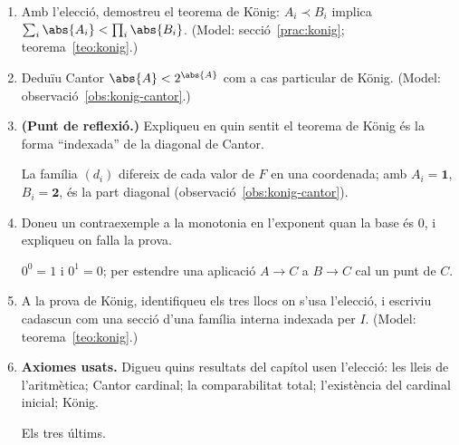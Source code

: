 \begin{enumerate}[resume]
  \item Amb l'elecció, demostreu el teorema de König: \(A_i\prec B_i\) implica \(\sum_i\abs{A_i}<\prod_i\abs{B_i}\). (Model: secció~\ref{prac:konig}; teorema~\ref{teo:konig}.)

  \item Deduïu Cantor \(\abs{A}<2^{\abs{A}}\) com a cas particular de König. (Model: observació~\ref{obs:konig-cantor}.)

  \item \textbf{(Punt de reflexió.)} Expliqueu en quin sentit el teorema de König és la forma \enquote{indexada} de la diagonal de Cantor. \begin{indicacio}La família \((d_i)\) difereix de cada valor de \(F\) en una coordenada; amb \(A_i=\mathbf1\), \(B_i=\mathbf2\), és la part diagonal (observació~\ref{obs:konig-cantor}).\end{indicacio}

  \item Doneu un contraexemple a la monotonia en l'exponent quan la base és \(0\), i expliqueu on falla la prova. \begin{indicacio}\(0^0=1\) i \(0^1=0\); per estendre una aplicació \(A\to C\) a \(B\to C\) cal un punt de \(C\).\end{indicacio}

  \item A la prova de König, identifiqueu els tres llocs on s'usa l'elecció, i escriviu cadascun com una secció d'una família interna indexada per \(I\). (Model: teorema~\ref{teo:konig}.)

  \item \textbf{Axiomes usats.} Digueu quins resultats del capítol usen l'elecció: les lleis de l'aritmètica; Cantor cardinal; la comparabilitat total; l'existència del cardinal inicial; König. \begin{indicacio}Els tres últims.\end{indicacio}
\end{enumerate}
